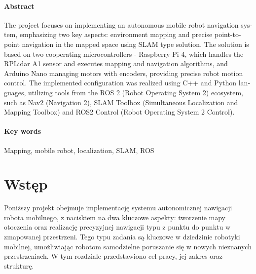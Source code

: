 \documentclass[a4paper,twoside,12pt]{book}
\newcounter{stronyPozaNumeracja}
\begin{document}
\subsubsection*{Abstract} 
\begin{otherlanguage}{british}
The project focuses on implementing an autonomous mobile robot navigation system, emphasizing two key aspects: environment mapping and precise point-to-point navigation in the mapped space using SLAM type solution. The solution is based on two cooperating microcontrollers - Raspberry Pi 4, which handles the RPLidar A1 sensor and executes mapping and navigation algorithms, and Arduino Nano managing motors with encoders, providing precise robot motion control. The implemented configuration was realized using C++ and Python languages, utilizing tools from the ROS 2 (Robot Operating System 2) ecosystem, such as Nav2 (Navigation 2), SLAM Toolbox (Simultaneous Localization and Mapping Toolbox) and ROS2 Control (Robot Operating System 2 Control).

\end{otherlanguage}
\subsubsection*{Key words}  
\begin{otherlanguage}{british}
Mapping, mobile robot, localization, SLAM, ROS
\end{otherlanguage}




\tableofcontents

\setcounter{stronyPozaNumeracja}{\value{page}}
\mainmatter
\pagestyle{empty}

\cleardoublepage

\pagestyle{NumeryStronNazwyRozdzialow}


\chapter{Wstęp}
\label{ch:wstep}
Poniższy projekt obejmuje implementację systemu autonomicznej nawigacji robota mobilnego, z naciskiem na dwa kluczowe aspekty: tworzenie mapy otoczenia oraz realizację precyzyjnej nawigacji typu z punktu do punktu w zmapowanej przestrzeni. Tego typu zadania są kluczowe w dziedzinie robotyki mobilnej, umożliwiając robotom samodzielne poruszanie się w nowych nieznanych przestrzeniach.
W tym rozdziale przedstawiono cel pracy, jej zakres oraz strukturę.
\end{document}
